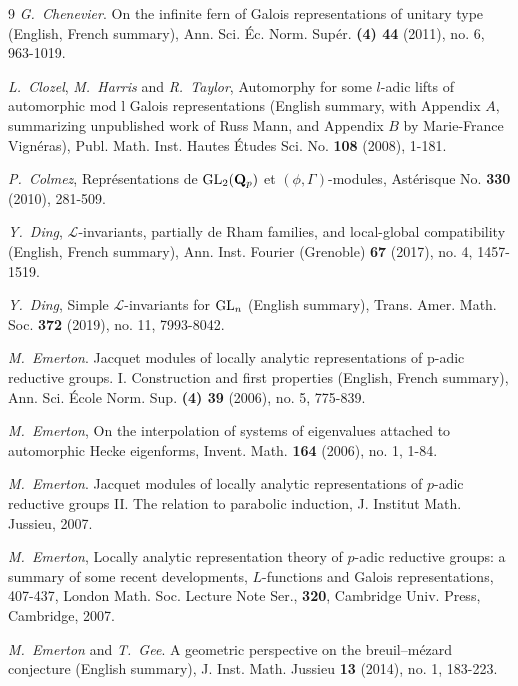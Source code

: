 \documentclass[SecEq,CM,GP]{degruyter-crelle} %
\theoremstyle{plain}
\newcommand{\GLN}{{\rm GL}}
\newcommand{\GL}{{\rm GL}}
\newcommand{\bQ}{{\mathbf{Q}}}
\newcommand{\sL}{\mathcal L}
\begin{document}
\begin{thebibliography}{9}
\textit{G.~Chenevier}.
On the infinite fern of Galois representations of unitary type (English, French summary),
Ann. Sci. \'{E}c. Norm. Sup\'{e}r. \textbf{(4) 44} (2011), no. 6, 963-1019.


\textit{L.~Clozel}, \textit{M.~Harris} and  \textit{R.~Taylor},
Automorphy for some $l$-adic lifts of automorphic mod l Galois representations (English summary, with Appendix $A$, summarizing unpublished work of Russ Mann, and Appendix $B$ by Marie-France Vign{\'e}ras),
Publ. Math. Inst. Hautes \'{E}tudes Sci. No. \textbf{108} (2008), 1-181.



\textit{P.~Colmez},
Repr\'{e}sentations de {${\GLN}_2(\bQ_p)$} et {$(\phi,\Gamma)$}-modules,
Ast\'{e}risque No. \textbf{330} (2010), 281-509. 


\textit{Y.~Ding},
$\mathcal{L}$-invariants, partially de Rham families, and local-global compatibility (English, French summary),
 Ann. Inst. Fourier (Grenoble) \textbf{67} (2017), no. 4, 1457-1519.


\textit{Y.~Ding}, 
Simple $\sL$-invariants for $\GL_{n}$ (English summary),
Trans. Amer. Math. Soc. \textbf{372} (2019), no. 11, 7993-8042.


\textit{M.~Emerton}.
Jacquet modules of locally analytic representations of p-adic reductive groups. I. Construction and first properties (English, French summary), Ann. Sci. \'{E}cole Norm. Sup. \textbf{(4) 39} (2006), no. 5, 775-839.

\textit{M.~Emerton}, 
On the interpolation of systems of eigenvalues attached to automorphic Hecke eigenforms, Invent. Math. \textbf{164} (2006), no. 1, 1-84.


\textit{M.~Emerton}.
Jacquet modules of locally analytic representations of $p$-adic reductive groups II. The relation to parabolic induction, J. Institut Math. Jussieu, 2007.

\textit{M.~Emerton}, 
Locally analytic representation theory of $p$-adic reductive groups: a summary of some recent developments, $L$-functions and Galois representations, 407-437,
London Math. Soc. Lecture Note Ser., \textbf{320}, Cambridge Univ. Press, Cambridge, 2007.



\textit{M.~Emerton} and \textit{T.~Gee}.
A geometric perspective on the breuil--m{\'e}zard conjecture (English summary), 
J. Inst. Math. Jussieu \textbf{13} (2014), no. 1, 183-223.



\end{thebibliography}
\end{document}
